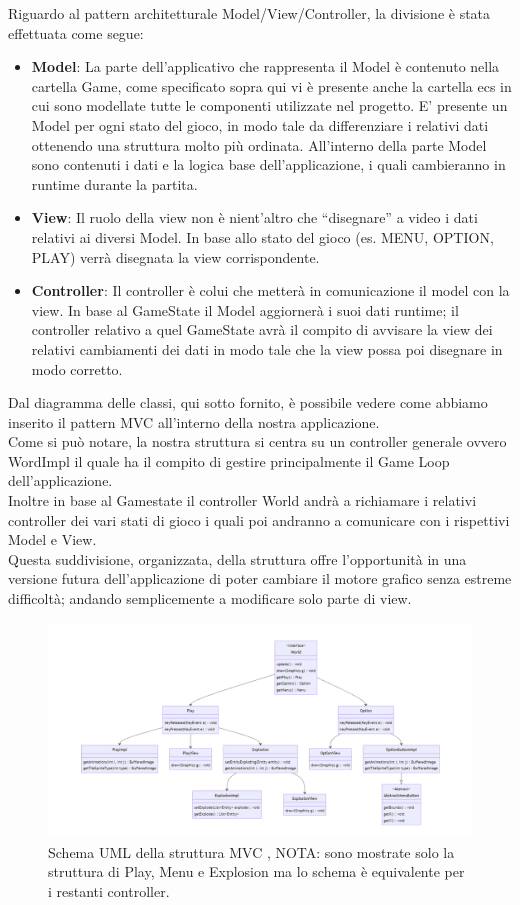 \documentclass[a4paper,12pt]{report}
\begin{document}
Riguardo al pattern architetturale Model/View/Controller, la divisione è stata effettuata come segue:
\begin{itemize}
    \item \textbf{Model}: La parte dell’applicativo che rappresenta il Model è contenuto nella cartella Game, come specificato sopra qui vi è presente anche la cartella ecs in cui sono modellate tutte le componenti utilizzate nel progetto. E’ presente un Model per ogni stato del gioco, in modo tale da differenziare i relativi dati ottenendo una struttura molto più ordinata. All’interno della parte Model sono contenuti i dati e la logica base dell’applicazione, i quali cambieranno in runtime durante la partita.
    \item \textbf{View}: Il ruolo della view non è nient'altro che “disegnare” a video i dati relativi ai diversi Model. In base allo stato del gioco (es. MENU, OPTION, PLAY) verrà disegnata la view corrispondente.
    \item \textbf{Controller}: Il controller è colui che metterà in comunicazione il model con la view. In base al GameState il Model aggiornerà i suoi dati runtime; il controller relativo a quel GameState avrà il compito di avvisare la view dei relativi cambiamenti dei dati in modo tale che la view possa poi disegnare in modo corretto.
\end{itemize}
Dal diagramma delle classi, qui sotto fornito, è possibile vedere come abbiamo inserito il pattern MVC all’interno della nostra applicazione.
\\
Come si può notare, la nostra struttura si centra su un controller generale ovvero WordImpl il quale ha il compito di gestire principalmente il Game Loop dell'applicazione.
\\
Inoltre in base al Gamestate il controller World andrà a richiamare i relativi controller dei vari stati di gioco i quali poi andranno a comunicare con i rispettivi Model e View.
\\
Questa suddivisione, organizzata, della struttura offre l'opportunità in una versione futura dell’applicazione di poter cambiare il motore grafico senza estreme difficoltà; andando semplicemente a modificare solo parte di view.
\begin{figure}[H]
    \centering{}
    \includegraphics[width=1\textwidth]{img/UMLMVC.png}
    \caption{Schema UML della struttura MVC ,
    NOTA: sono mostrate solo la struttura di Play, Menu e Explosion ma lo schema è equivalente per i restanti controller.}
\end{figure}
\end{document}
